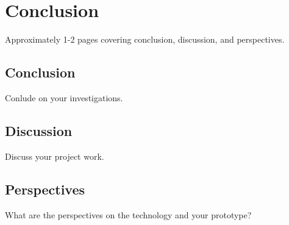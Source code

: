 \documentclass[Main]{subfiles}
\begin{document}
\chapter{Conclusion}
Approximately 1-2 pages covering conclusion, discussion, and perspectives.
\section{Conclusion}
Conlude on your investigations.
\section{Discussion}
Discuss your project work.
\section{Perspectives}
What are the perspectives on the technology and your prototype? 
\end{document}
